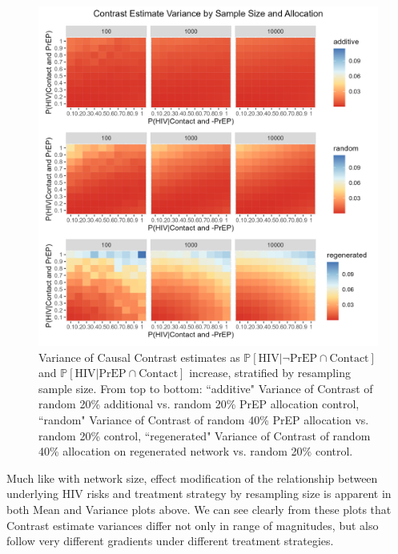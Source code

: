 \documentclass{article}
\theoremstyle{definition}
\begin{document}
\begin{figure}[H]
    \centering
    \includegraphics[width=\linewidth]{Figures/Sample Size Variance plots.png}
    \caption{Variance of Causal Contrast estimates as $\mathbb{P}\left[\text{HIV} \vert \neg \text{PrEP} \cap \text{Contact}\right]$ and $\mathbb{P}\left[\text{HIV} \vert \text{PrEP} \cap \text{Contact}\right]$ increase, stratified by resampling sample size. From top to bottom: ``additive" Variance of Contrast of random 20\% additional vs. random 20\% PrEP allocation control, ``random" Variance of Contrast of random 40\% PrEP allocation vs. random 20\% control, ``regenerated" Variance of Contrast of random 40\% allocation on regenerated network vs. random 20\% control.}
    \label{fig:Figure 10}
\end{figure}
Much like with network size, effect modification of the relationship between underlying HIV risks and treatment strategy by resampling size is apparent in both Mean and Variance plots above. We can see clearly from these plots that Contrast estimate variances differ not only in range of magnitudes, but also follow very different gradients under different treatment strategies.
\end{document}
